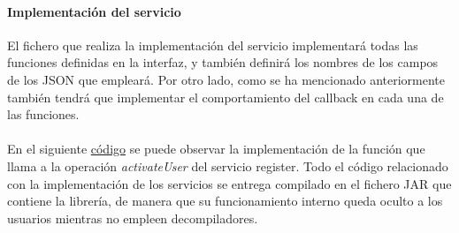 \documentclass[a4paper, 12pt]{article}
\begin{document}
\paragraph{Implementación del servicio}
\label{sec-4-1-3-2}
El fichero que realiza la implementación del servicio implementará todas las funciones definidas en la interfaz, y también definirá los nombres de los campos de los JSON que empleará. Por otro lado,
como se ha mencionado anteriormente también tendrá que implementar el comportamiento del callback en cada una de las funciones.
\\
\\
En el siguiente \hyperref[code:android-implementation]{código} se puede observar
la implementación de la función que llama a la operación \emph{activateUser} del servicio register. Todo el código relacionado con la implementación de los servicios se entrega compilado en el fichero JAR que contiene
la librería, de manera que su funcionamiento interno queda oculto a los usuarios mientras no empleen decompiladores.
\end{document}
